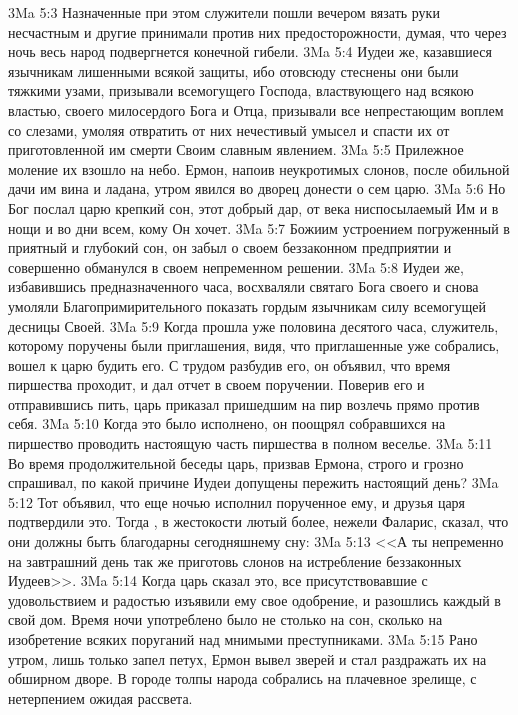 \vs 3Ma 5:3 Назначенные при этом служители пошли вечером вязать руки несчастным и другие принимали против них предосторожности, думая, что через ночь весь народ подвергнется конечной гибели.
\vs 3Ma 5:4 Иудеи же, казавшиеся язычникам лишенными всякой защиты, ибо отовсюду стеснены они были тяжкими узами, призывали всемогущего Господа, властвующего над всякою властью, своего милосердого Бога и Отца, призывали все непрестающим воплем со слезами, умоляя отвратить от них нечестивый умысел и спасти их от приготовленной им смерти Своим славным явлением.
\rsbpar\vs 3Ma 5:5 Прилежное моление их взошло на небо. Ермон, напоив неукротимых слонов, после обильной дачи им вина и ладана, утром явился во дворец донести о сем царю.
\vs 3Ma 5:6 Но Бог послал царю крепкий сон, этот добрый дар, от века ниспосылаемый Им и в нощи и во дни всем, кому Он хочет.
\vs 3Ma 5:7 Божиим устроением погруженный в приятный и глубокий сон, он забыл о своем беззаконном предприятии и совершенно обманулся в своем непременном решении.
\vs 3Ma 5:8 Иудеи же, избавившись предназначенного часа, восхваляли святаго Бога своего и снова умоляли Благопримирительного показать гордым язычникам силу всемогущей десницы Своей.
\vs 3Ma 5:9 Когда прошла уже половина десятого часа, служитель, которому поручены были приглашения, видя, что приглашенные уже собрались, вошел к царю будить его. С трудом разбудив его, он объявил, что время пиршества проходит, и дал отчет в своем поручении. Поверив его и отправившись пить, царь приказал пришедшим на пир возлечь прямо против себя.
\vs 3Ma 5:10 Когда это было исполнено, он поощрял собравшихся на пиршество проводить настоящую часть пиршества в полном веселье.
\vs 3Ma 5:11 Во время продолжительной беседы царь, призвав Ермона, строго и грозно спрашивал, по какой причине Иудеи допущены пережить настоящий день?
\vs 3Ma 5:12 Тот объявил, что еще ночью исполнил порученное ему, и друзья царя подтвердили это. Тогда , в жестокости лютый более, нежели Фаларис, сказал, что они должны быть благодарны сегодняшнему сну:
\vs 3Ma 5:13 <<А ты непременно на завтрашний день так же приготовь слонов на истребление беззаконных Иудеев>>.
\vs 3Ma 5:14 Когда царь сказал это, все присутствовавшие с удовольствием и радостью изъявили ему свое одобрение, и разошлись каждый в свой дом. Время ночи употреблено было не столько на сон, сколько на изобретение всяких поруганий над мнимыми преступниками.
\vs 3Ma 5:15 Рано утром, лишь только запел петух, Ермон вывел зверей и стал раздражать их на обширном дворе. В городе толпы народа собрались на плачевное зрелище, с нетерпением ожидая рассвета.
